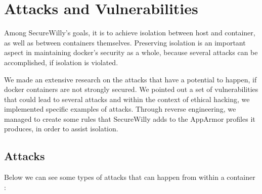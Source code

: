 \chapter{Attacks and Vulnerabilities}
Among SecureWilly's goals, it is to achieve isolation between host and container, as well as between containers themselves.
Preserving isolation is an important aspect in maintaining docker's security as a whole, because several attacks can be accomplished, if isolation is violated.

We made an extensive research on the attacks that have a potential to happen, if docker containers are not strongly secured. We pointed out a set of vulnerabilities that could lead to several attacks and within the context of ethical hacking, we implemented specific examples of attacks. Through reverse engineering, we managed to create some rules that SecureWilly adds to the AppArmor profiles it produces, in order to assist isolation. 

\section{Attacks}
Below we can see some types of attacks that can happen from within a container \cite{securityattacks}: 

